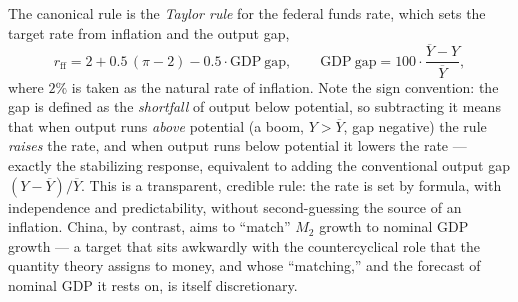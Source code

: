 The canonical rule is the \emph{Taylor rule} for the federal funds rate, which sets the target rate from inflation and the output gap,
\[
r_{\mathrm{ff}} = 2 + 0.5\,(\pi - 2) - 0.5\cdot \mathrm{GDP\ gap}, \qquad
\mathrm{GDP\ gap} = 100\cdot\frac{\overline{Y}-Y}{\overline{Y}},
\]
where $2\%$ is taken as the natural rate of inflation. Note the sign convention: the gap is defined as the \emph{shortfall} of output below potential, so subtracting it means that when output runs \emph{above} potential (a boom, $Y>\overline{Y}$, gap negative) the rule \emph{raises} the rate, and when output runs below potential it lowers the rate --- exactly the stabilizing response, equivalent to adding the conventional output gap $(Y-\overline{Y})/\overline{Y}$. This is a transparent, credible rule: the rate is set by formula, with independence and predictability, without second-guessing the source of an inflation. China, by contrast, aims to ``match'' $M_2$ growth to nominal GDP growth --- a target that sits awkwardly with the countercyclical role that the quantity theory assigns to money, and whose ``matching,'' and the forecast of nominal GDP it rests on, is itself discretionary.

